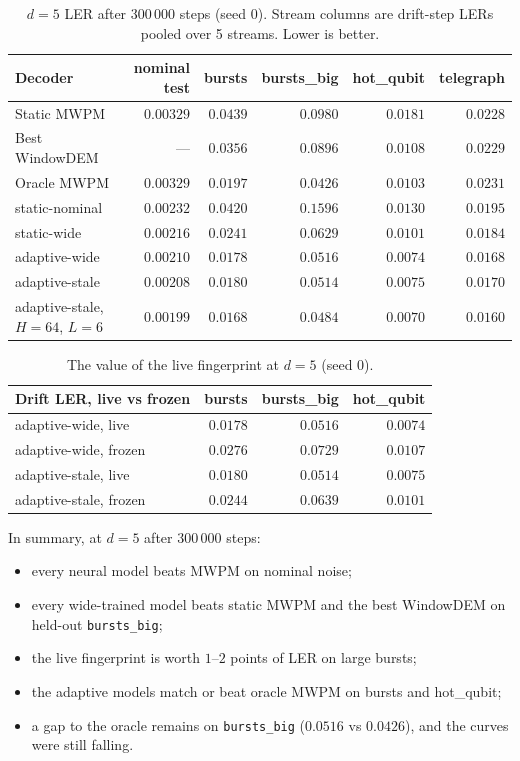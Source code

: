 \documentclass[11pt,a4paper]{article}
\newcommand{\code}[1]{\texttt{#1}}
\begin{document}
\begin{table}[h]
\centering
\small
\begin{tabular}{lrrrrr}
\toprule
Decoder & nominal test & bursts & bursts\_big & hot\_qubit & telegraph \\
\midrule
Static MWPM & $0.00329$ & $0.0439$ & $0.0980$ & $0.0181$ & $0.0228$ \\
Best WindowDEM & --- & $0.0356$ & $0.0896$ & $0.0108$ & $0.0229$ \\
Oracle MWPM & $0.00329$ & $0.0197$ & $0.0426$ & $0.0103$ & $0.0231$ \\
\midrule
static-nominal & $0.00232$ & $0.0420$ & $0.1596$ & $0.0130$ & $0.0195$ \\
static-wide & $0.00216$ & $0.0241$ & $0.0629$ & $0.0101$ & $0.0184$ \\
adaptive-wide & $0.00210$ & $0.0178$ & $0.0516$ & $0.0074$ & $0.0168$ \\
adaptive-stale & $0.00208$ & $0.0180$ & $0.0514$ & $0.0075$ & $0.0170$ \\
adaptive-stale, $H{=}64$, $L{=}6$ & $0.00199$ & $0.0168$ & $0.0484$ & $0.0070$ & $0.0160$ \\
\bottomrule
\end{tabular}
\caption{$d=5$ LER after $300\,000$ steps (seed 0). Stream columns are drift-step LERs pooled over 5 streams.
Lower is better.}
\label{tab:d5}
\end{table}

\begin{table}[h]
\centering
\small
\begin{tabular}{lrrr}
\toprule
Drift LER, live vs frozen & bursts & bursts\_big & hot\_qubit \\
\midrule
adaptive-wide, live & $0.0178$ & $0.0516$ & $0.0074$ \\
adaptive-wide, frozen & $0.0276$ & $0.0729$ & $0.0107$ \\
adaptive-stale, live & $0.0180$ & $0.0514$ & $0.0075$ \\
adaptive-stale, frozen & $0.0244$ & $0.0639$ & $0.0101$ \\
\bottomrule
\end{tabular}
\caption{The value of the live fingerprint at $d=5$ (seed 0).}
\end{table}

\noindent In summary, at $d=5$ after $300\,000$ steps:
\begin{itemize}
  \item every neural model beats MWPM on nominal noise;
  \item every wide-trained model beats static MWPM and the best WindowDEM on held-out \code{bursts\_big};
  \item the live fingerprint is worth $1$--$2$ points of LER on large bursts;
  \item the adaptive models match or beat oracle MWPM on bursts and hot\_qubit;
  \item a gap to the oracle remains on \code{bursts\_big} ($0.0516$ vs $0.0426$), and the curves were still falling.
\end{itemize}
\end{document}
